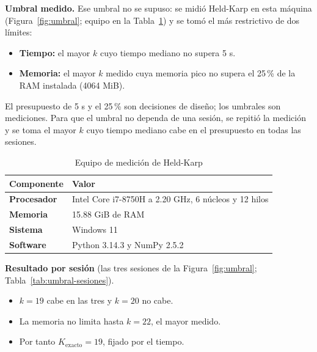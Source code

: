 \documentclass[12pt,a4paper]{article}
\begin{document}
\textbf{Umbral medido.} Ese umbral no se supuso: se midió Held-Karp en esta
máquina (Figura~\ref{fig:umbral}; equipo en la Tabla~\ref{tab:equipo}) y se
tomó el más restrictivo de dos límites:
\begin{itemize}
\item \textbf{Tiempo:} el mayor $k$ cuyo tiempo mediano no supera 5 s.
\item \textbf{Memoria:} el mayor $k$ medido cuya memoria pico no supera el
25\,\% de la RAM instalada (4064 MiB).
\end{itemize}
El presupuesto de 5 s y el 25\,\% son decisiones de diseño; los umbrales son
mediciones. Para que el umbral no dependa de una sesión, se repitió la
medición y se toma el mayor $k$ cuyo tiempo mediano cabe en el presupuesto en
todas las sesiones.

\begin{table}[H]
\centering
\caption{Equipo de medición de Held-Karp}
\label{tab:equipo}
\small
\renewcommand{\arraystretch}{1.2}
\begin{tabular}{|l|l|}
\hline
\rowcolor{gray!20} \textbf{Componente} & \textbf{Valor} \\
\hline
\textbf{Procesador} & Intel Core i7-8750H a 2.20 GHz, 6 núcleos y 12 hilos \\
\hline
\textbf{Memoria} & 15.88 GiB de RAM \\
\hline
\textbf{Sistema} & Windows 11 \\
\hline
\textbf{Software} & Python 3.14.3 y NumPy 2.5.2 \\
\hline
\end{tabular}
\end{table}

\textbf{Resultado por sesión} (las tres sesiones de la
Figura~\ref{fig:umbral}; Tabla~\ref{tab:umbral-sesiones}).
\begin{itemize}
\item $k = 19$ cabe en las tres y $k = 20$ no cabe.
\item La memoria no limita hasta $k = 22$, el mayor medido.
\item Por tanto $K_{\mathrm{exacto}} = 19$, fijado por el tiempo.
\end{itemize}

\begin{table}[!htbp]
\centering
\caption{Held-Karp: mediana de cada sesión (S1 a S3) y memoria pico para los $k$ que fijan el umbral. Fuente: elaboración propia}
\label{tab:umbral-sesiones}
\small

\end{table}
\end{document}
